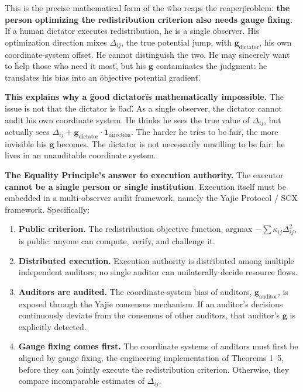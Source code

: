 \documentclass[12pt,a4paper]{article}
\theoremstyle{remark}
\begin{document}
This is the precise mathematical form of the \"who reaps the reaper\" problem: \textbf{the person optimizing the redistribution criterion also needs gauge fixing}. If a human dictator executes redistribution, he is a single observer. His optimization direction mixes $\Delta_{ij}$, the true potential jump, with $\mathbf{g}_{\text{dictator}}$, his own coordinate-system offset. He cannot distinguish the two. He may sincerely want to \"help those who need it most\", but his $\mathbf{g}$ contaminates the judgment: he translates his bias into an \"objective potential gradient\".

\textbf{This explains why a \"good dictator\" is mathematically impossible.} The issue is not that the dictator is \"bad\". As a single observer, the dictator cannot audit his own coordinate system. He thinks he sees the true value of $\Delta_{ij}$, but actually sees $\Delta_{ij} + \mathbf{g}_{\text{dictator}} \cdot \mathbf{1}_{\text{direction}}$. The harder he tries to be \"fair\", the more invisible his $\mathbf{g}$ becomes. The dictator is not necessarily unwilling to be fair; he lives in an unauditable coordinate system.

\textbf{The Equality Principle's answer to execution authority.} The executor \textbf{cannot be a single person or single institution}. Execution itself must be embedded in a multi-observer audit framework, namely the Yajie Protocol / SCX framework. Specifically:

\begin{enumerate}
    \item \textbf{Public criterion.} The redistribution objective function, argmax $-\sum\kappa_{ij}\Delta_{ij}^2$, is public: anyone can compute, verify, and challenge it.
    \item \textbf{Distributed execution.} Execution authority is distributed among multiple independent auditors; no single auditor can unilaterally decide resource flows.
    \item \textbf{Auditors are audited.} The coordinate-system bias of auditors, $\mathbf{g}_{\text{auditor}}$, is exposed through the Yajie consensus mechanism. If an auditor's decisions continuously deviate from the consensus of other auditors, that auditor's $\mathbf{g}$ is explicitly detected.
    \item \textbf{Gauge fixing comes first.} The coordinate systems of auditors must first be aligned by gauge fixing, the engineering implementation of Theorems 1--5, before they can jointly execute the redistribution criterion. Otherwise, they compare incomparable estimates of $\Delta_{ij}$.
\end{enumerate}
\end{document}
